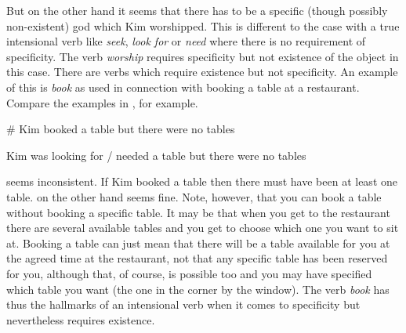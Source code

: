 But on the other hand it seems that there has to be a specific (though
possibly non-existent) god which Kim worshipped.  This is different to
the case with a true intensional verb like \textit{seek},
\textit{look for} or \textit{need} where there is no requirement of
specificity.  The verb \textit{worship} requires
specificity but not existence of the object in this case.  There are
verbs which require existence but not specificity.  An example of this
is \textit{book} as used in connection with booking a table at a
restaurant.  Compare the examples in \nexteg{}, for example.
\begin{ex} 
\begin{subex} 
 
\item \# Kim booked a table but there were no tables 
 
\item Kim was looking for / needed a table but there were no tables 
 
\end{subex} 
   
\end{ex} 
 seems inconsistent.  If Kim booked a table then there must
have been at least one table.   on the other hand seems
fine.  Note, however, that you can book a table without booking a
specific table.  It may be that when you get to the restaurant there
are several available tables and you get to choose which one you want
to sit at.  Booking a table can just mean that there will be a table
available for you at the agreed time at the restaurant, not that any
specific table has been reserved for you, although that, of course, is
possible too and you may have specified which table you want (the
one in the corner by the window).  The verb \textit{book} has thus the
hallmarks of an intensional verb when it comes to specificity but
nevertheless requires existence.

